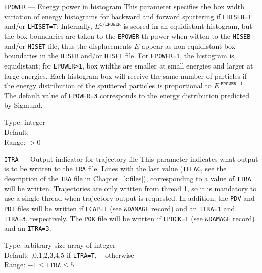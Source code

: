 \begin{keydescription}{\texttt{EPOWER} --- Energy power in histogram}
%
  This parameter specifies the box width variation of energy histograms for backward and 
  forward sputtering if \texttt{LHISEB=T} and/or \texttt{LHISET=T}: Internally, 
  $E^\texttt{1/EPOWER}$ is scored in an equidistant histogram, but the box boundaries are 
  taken to the \texttt{EPOWER}-th power when witten to the \texttt{HISEB} and/or \texttt{HISET} 
  file, thus the displacements $E$ appear as non-equidistant box boundaries in the 
  \texttt{HISEB} and/or \texttt{HISET} file. For \texttt{EPOWER=1}, the histogram is 
  equidistant; for \texttt{EPOWER>1}, box widths are smaller at small energies and larger at 
  large energies. Each histogram box will receive the same number of particles if the energy 
  distribution of the sputtered particles is proportional to $E^\texttt{-EPOWER+1}$. The 
  default value of \texttt{EPOWER=3} corresponds to the energy distribution predicted by 
  Sigmund. 
  \begin{keytab}
    Type:    \> integer \\
    Default:   \\
    Range:   \> $>0$
  \end{keytab}
\end{keydescription}

\begin{keydescription}{\texttt{ITRA} --- Output indicator for trajectory file}
%
  This parameter indicates what output is to be written to the \texttt{TRA} file. Lines with 
  the last value (\texttt{IFLAG}, see the description of the \texttt{TRA} file
  in Chapter~\ref{k:files}), corresponding to a value of \texttt{ITRA} will be
  written. 
  Trajectories are only written from thread 1, so it is mandatory to use a single thread 
  when trajectory output is requested.
  In addition, the \texttt{PDV} and \texttt{PDI} files will be written
  if \texttt{LCAP=T} (see \texttt{\&DAMAGE} record) and an \texttt{ITRA=1}
  and \texttt{ITRA=3}, respectively. The \texttt{POK} file will be written if
  \texttt{LPOCK=T} (see \texttt{\&DAMAGE} record) and an \texttt{ITRA=3}.
  \begin{keytab}
    Type:    \> arbitrary-size array of integer \\
    Default: ,0,1,2,3,4,5 if \texttt{LTRA=T}, -- otherwise \\
    Range:   \> $-1 \le \texttt{ITRA} \le 5$
  \end{keytab}
\end{keydescription}

